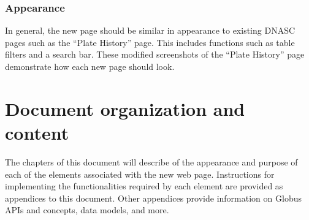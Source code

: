 \subsubsection{Appearance}
In general, the new page should be similar in appearance to existing DNASC pages such as 
the ``Plate History'' page. This includes functions such as table filters and a search bar. 
These modified screenshots of the ``Plate History'' page demonstrate how each new page 
should look.

\section{Document organization and content}

The chapters of this document will describe of the appearance and purpose of each of the
elements associated with the new web page. Instructions for implementing the 
functionalities required by each element are provided as appendices to this document. 
Other appendices provide information on Globus APIs and concepts, data models, and more.
